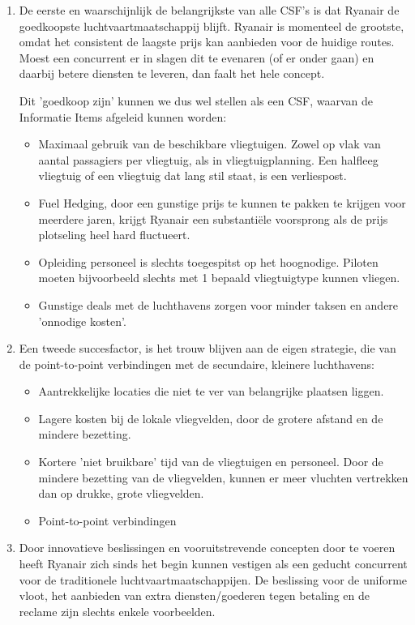 \documentclass{article}
\begin{document}
\begin{enumerate}
\item De eerste en waarschijnlijk de belangrijkste van alle CSF's is dat Ryanair de goedkoopste luchtvaartmaatschappij blijft. Ryanair is momenteel de grootste, omdat het consistent de laagste prijs kan aanbieden voor de huidige routes. Moest een concurrent er in slagen dit te evenaren (of er onder gaan) en daarbij betere diensten te leveren, dan faalt het hele concept. 

Dit 'goedkoop zijn' kunnen we dus wel stellen als een CSF, waarvan de Informatie Items afgeleid kunnen worden:

\begin{itemize}
\item Maximaal gebruik van de beschikbare vliegtuigen. Zowel op vlak van aantal passagiers per vliegtuig, als in vliegtuigplanning. Een halfleeg vliegtuig of een vliegtuig dat lang stil staat, is een verliespost.
\item Fuel Hedging, door een gunstige prijs te kunnen te pakken te krijgen voor meerdere jaren, krijgt Ryanair een substanti\"ele voorsprong als de prijs plotseling heel hard fluctueert.
\item Opleiding personeel is slechts toegespitst op het hoognodige. Piloten moeten bijvoorbeeld slechts met 1 bepaald vliegtuigtype kunnen vliegen.
\item Gunstige deals met de luchthavens zorgen voor minder taksen en andere 'onnodige kosten'.
\end{itemize}

\item Een tweede succesfactor, is het trouw blijven aan de eigen strategie, die van de point-to-point verbindingen met de secundaire, kleinere luchthavens:

\begin{itemize}
\item Aantrekkelijke locaties die niet te ver van belangrijke plaatsen liggen.
\item Lagere kosten bij de lokale vliegvelden, door de grotere afstand en de mindere bezetting.
\item Kortere 'niet bruikbare' tijd van de vliegtuigen en personeel. Door de mindere bezetting van de vliegvelden, kunnen er meer vluchten vertrekken dan op drukke, grote vliegvelden.
\item Point-to-point verbindingen 
\end{itemize}

\item Door innovatieve beslissingen en vooruitstrevende concepten door te voeren heeft Ryanair zich sinds het begin kunnen vestigen als een geducht concurrent voor de traditionele luchtvaartmaatschappijen. De beslissing voor de uniforme vloot, het aanbieden van extra diensten/goederen tegen betaling en de reclame zijn slechts enkele voorbeelden.


\end{enumerate}
\end{document}
